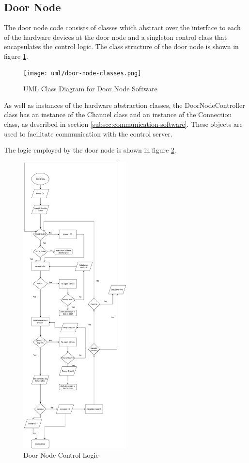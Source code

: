 \subsection{Door Node}

The door node code consists of classes which abstract over the interface to each
of the hardware devices at the door node and a singleton control class that
encapsulates the control logic. The class structure of the door node is shown in
figure \ref{fig:door-node-classes}.

\begin{figure}[!htb]
\centering
\texttt{[image: uml/door-node-classes.png]}
\caption{UML Class Diagram for Door Node Software}
\label{fig:door-node-classes}
\end{figure}

As well as instances of the hardware abstraction classes, the DoorNodeController
class has an instance of the Channel class and an instance of the Connection
class, as described in section \ref{subsec:communication-software}. These
objects are used to facilitate communication with the control server.

The logic employed by the door node is shown in figure
\ref{fig:door-node-logic}.

\begin{figure}[!htb]
\centering
\includegraphics[width=0.5\textwidth]{images/server-door-msg-flow.png}
\caption{Door Node Control Logic}
\label{fig:door-node-logic}
\end{figure}

